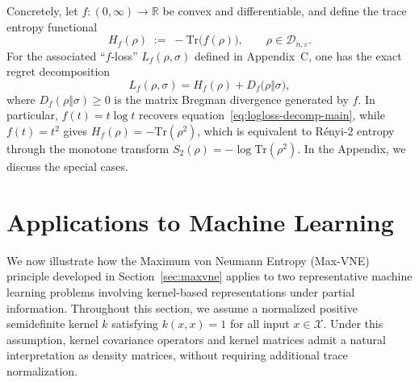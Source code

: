 \documentclass{article}
\theoremstyle{plain}
\theoremstyle{definition}
\def\eqref#1{equation~\ref{#1}}
\begin{document}
Concretely, let $f:(0,\infty)\to\mathbb{R}$ be convex and differentiable, and define the
trace entropy functional
\begin{equation}
H_f(\rho)
\;:=\;
-\mathrm{Tr}\bigl(f(\rho)\bigr),
\qquad \rho\in\mathcal{D}_{n,\varepsilon}.
\label{eq:Hf-main}
\end{equation}
For the associated ``$f$-loss'' $L_f(\rho,\sigma)$ defined in Appendix~C, one has the
exact regret decomposition
\begin{equation}
L_f(\rho,\sigma)
=
H_f(\rho) + D_f\bigl(\rho\Vert\sigma\bigr),
\label{eq:f-decomp-main}
\end{equation}
where $D_f(\rho\Vert\sigma)\ge 0$ is the matrix Bregman divergence generated by $f$.
In particular, $f(t)=t\log t$ recovers \eqref{eq:logloss-decomp-main},
while $f(t)=t^2$ gives $H_f(\rho)=-\mathrm{Tr}(\rho^2)$, which is equivalent to
R\'enyi-$2$ entropy through the monotone transform $S_2(\rho)=-\log \mathrm{Tr}(\rho^2)$. In the Appendix, we discuss the special cases.

\section{Applications to Machine Learning}
\label{sec:applications}

We now illustrate how the Maximum von Neumann Entropy (Max-VNE) principle developed
in Section~\ref{sec:maxvne} applies to two representative machine learning problems
involving kernel-based representations under partial information.
Throughout this section, we assume a normalized positive semidefinite kernel
$k$ satisfying $k(x,x)=1$ for all input $x\in\mathcal{X}$.
Under this assumption, kernel covariance operators and kernel matrices admit a
natural interpretation as density matrices, without requiring additional trace
normalization.
\end{document}
